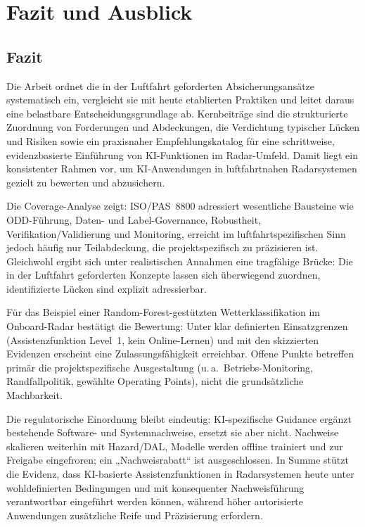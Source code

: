 \chapter{Fazit und Ausblick}\label{chap:fazit-ausblick}

\section{Fazit}

Die Arbeit ordnet die in der Luftfahrt geforderten Absicherungsansätze systematisch ein, 
vergleicht sie mit heute etablierten Praktiken und leitet daraus eine belastbare 
Entscheidungsgrundlage ab. Kernbeiträge sind die strukturierte Zuordnung von Forderungen und 
Abdeckungen, die Verdichtung typischer Lücken und Risiken sowie ein praxisnaher Empfehlungskatalog 
für eine schrittweise, evidenzbasierte Einführung von KI-Funktionen im Radar-Umfeld. Damit liegt ein 
konsistenter Rahmen vor, um KI-Anwendungen in luftfahrtnahen Radarsystemen gezielt zu bewerten und abzusichern.

\medskip
Die Coverage-Analyse zeigt: ISO/PAS~8800 adressiert wesentliche Bausteine wie ODD-Führung, Daten- und 
Label-Governance, Robustheit, Verifikation/Validierung und Monitoring, erreicht im luftfahrtspezifischen 
Sinn jedoch häufig nur Teilabdeckung, die projektspezifisch zu präzisieren ist. Gleichwohl ergibt sich unter 
realistischen Annahmen eine tragfähige Brücke: Die in der Luftfahrt geforderten Konzepte lassen sich überwiegend 
zuordnen, identifizierte Lücken sind explizit adressierbar.

\medskip
Für das Beispiel einer Random-Forest-gestützten Wetterklassifikation im Onboard-Radar bestätigt die Bewertung: 
Unter klar definierten Einsatzgrenzen (Assistenzfunktion Level~1, kein Online-Lernen) und mit den skizzierten 
Evidenzen erscheint eine Zulassungsfähigkeit erreichbar. Offene Punkte betreffen primär die projektspezifische 
Ausgestaltung (u.\,a.\ Betriebs-Monitoring, Randfallpolitik, gewählte Operating Points), nicht die grundsätzliche 
Machbarkeit.

\medskip
Die regulatorische Einordnung bleibt eindeutig: KI-spezifische Guidance ergänzt bestehende Software- und 
Systemnachweise, ersetzt sie aber nicht. Nachweise skalieren weiterhin mit Hazard/DAL, Modelle werden offline 
trainiert und zur Freigabe eingefroren; ein „Nachweisrabatt“ ist ausgeschlossen. In Summe stützt die Evidenz, 
dass KI-basierte Assistenzfunktionen in Radarsystemen heute unter wohldefinierten Bedingungen und mit konsequenter 
Nachweisführung verantwortbar eingeführt werden können, während höher autorisierte Anwendungen zusätzliche Reife 
und Präzisierung erfordern. 


